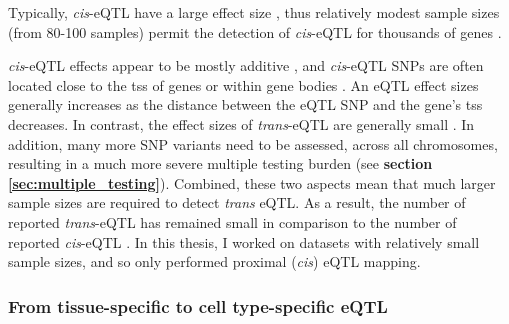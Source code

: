 Typically, \textit{cis}-eQTL have a large effect size \cite{sherman2009systematic}, thus relatively modest sample sizes (from 80-100 samples) permit the detection of \textit{cis}-eQTL for thousands of genes \cite{stranger2007population, myers2007survey}.

\textit{cis}-eQTL effects appear to be mostly additive \cite{powell2013congruence}, and \textit{cis}-eQTL SNPs are often located close to the \gls{tss} of genes or within gene bodies 
\cite{vosa2018unraveling}. 
An eQTL effect sizes generally increases as the distance between the eQTL SNP and the gene's \gls{tss} decreases.
In contrast, the effect sizes of \textit{trans}-eQTL are generally small \cite{cookson2009mapping, grundberg2012mapping}. In addition, many more SNP variants need to be assessed, across all chromosomes, resulting in a much more severe multiple testing burden (see \textbf{section \ref{sec:multiple_testing}}).
Combined, these two aspects mean that much larger sample sizes are required to detect \textit{trans} eQTL.
As a result, the number of reported \textit{trans}-eQTL has remained small
\cite{grundberg2012mapping}
in comparison to the number of reported \textit{cis}-eQTL \cite{westra2014genome}.
In this thesis, I worked on datasets with relatively small sample sizes, and so only performed proximal (\textit{cis}) eQTL mapping.

\subsubsection{From tissue-specific to cell type-specific eQTL}
\label{sec:eqtl_celltype_specific}

